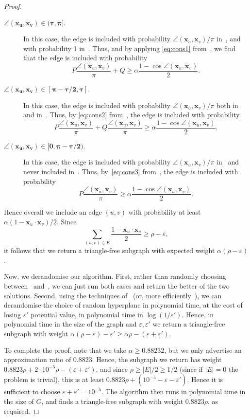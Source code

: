 \documentclass[a4paper,11pt, DIV=11]{scrartcl}
\newcommand{\vx}{\ensuremath{\mathbf{x}}}
\renewcommand{\epsilon}{\varepsilon}
\theoremstyle{plain}
\theoremstyle{definition}
\begin{document}
\begin{proof}
    \begin{description}
    \item[$\bm{\angle(\vx_u, \vx_v) \in (\tau, \pi]}$.]
    In this case, the edge is included with probability $\angle(\vx_u, \vx_v) / \pi$ in~, and with probability 1 in~. Thus, and by applying \eqref{eq:cons1} from~, we find that the edge is included with probability
    \[
    P \frac{\angle(\vx_u, \vx_v)}{\pi} + Q \geq \alpha\frac{1 - \cos \angle(\vx_u, \vx_v)}{2}.
    \]
    
    \item[$\bm{\angle(\vx_u, \vx_v) \in [\pi - \tau / 2, \tau]}$.]
    In this case, the edge is included with probability $\angle(\vx_u, \vx_v) / \pi$ both in~ and in~. Thus, by \eqref{eq:cons2} from~, the edge is included with probability
    \[
    P \frac{\angle(\vx_u, \vx_v)}{\pi} + Q
    \frac{\angle(\vx_u, \vx_v)}{\pi} \geq \alpha\frac{1 - \cos \angle(\vx_u, \vx_v)}{2}.
    \]
    
    \item[$\bm{\angle(\vx_u, \vx_v) \in [0, \pi - \tau / 2)}$.]
    In this case, the edge is included with probability $\angle(\vx_u, \vx_v) / \pi$ in~ and never included in~. Thus, by~\eqref{eq:cons3} from~, the edge is included with probability
    \[
    P \frac{\angle(\vx_u, \vx_v)}{\pi} \geq \alpha\frac{1 - \cos \angle(\vx_u, \vx_v)}{2}.
    \]
    \end{description}

    Hence overall we include an edge $(u, v)$ with probability at least $\alpha (1 - \vx_u \cdot \vx_v) / 2$. Since
    \[
    \sum_{(u, v) \in E} \frac{1 - \vx_u \cdot \vx_v}{2} \geq \rho - \epsilon,
    \]
    it follows that we return a triangle-free subgraph with expected weight $\alpha (\rho - \epsilon)$.

    Now, we derandomise our algorithm. First, rather than randomly choosing between~ and~, we can just run both cases and return the better of the two solutions. Second, using the techniques of~\cite{Mahajan99:sicomp} (or, more efficiently~\cite{BK05}), we can derandomise the choice of random hyperplane in polynomial time, at the cost of losing $\epsilon'$ potential value, in polynomial time in $\log(1 / \epsilon')$. Hence, in polynomial time in the size of the graph and $\epsilon, \epsilon'$ we return a triangle-free subgraph with weight $\alpha (\rho - \epsilon) - \epsilon' \geq \alpha \rho - (\epsilon + \epsilon')$.

    To complete the proof, note that we take $\alpha \geq 0.88232$, but we only advertise an approximation ratio of $0.8823$. Hence, the subgraph we return has weight $0.8823 \rho + 2 \cdot 10^{-5} \rho - (\epsilon + \epsilon')$, and since $\rho \geq |E|/2 \geq 1/2$ (since if $|E| = 0$ the problem is trivial), this is at least $0.8823 \rho + (10^{-5} - \epsilon - \epsilon')$. Hence it is sufficient to choose $\epsilon + \epsilon' = 10^{-5}$. The algorithm then runs in polynomial time in the size of $G$, and finds a triangle-free subgraph with weight $0.8823 \rho$, as required.
\end{proof}
\end{document}
